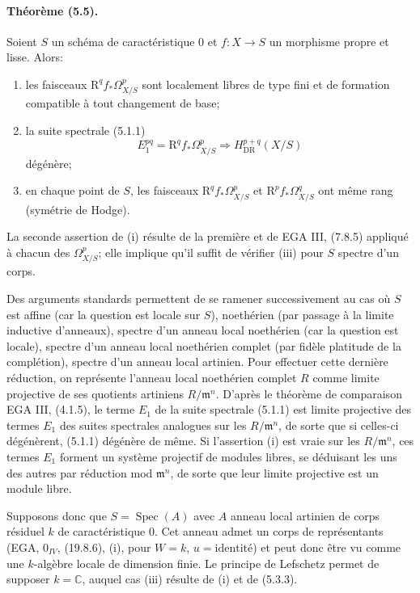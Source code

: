 \documentclass[10pt]{article}
\newcommand{\R}{\mathrm R}
\providecommand{\C}{\mathbb C}
\providecommand{\Spec}{\operatorname{Spec}}
\providecommand{\DR}{\operatorname{DR}}
\begin{document}
\paragraph{Théorème (5.5).} Soient $S$ un schéma de caractéristique $0$ et $f:X\to S$ un morphisme propre et lisse. Alors:
\begin{enumerate}[label=(\roman*)]
\item les faisceaux $\R^qf_*\Omega_{X/S}^p$ sont localement libres de type fini et de formation compatible à tout changement de base;
\item la suite spectrale (5.1.1)
\[
E_1^{pq}=\R^qf_*\Omega_{X/S}^p\Longrightarrow H_{\DR}^{p+q}(X/S)
\]
dégénère;
\item en chaque point de $S$, les faisceaux $\R^qf_*\Omega_{X/S}^p$ et $\R^pf_*\Omega_{X/S}^q$ ont même rang (symétrie de Hodge).
\end{enumerate}
La seconde assertion de (i) résulte de la première et de EGA III, (7.8.5) appliqué à chacun des $\Omega_{X/S}^p$; elle implique qu'il suffit de vérifier (iii) pour $S$ spectre d'un corps.

Des arguments standards permettent de se ramener successivement au cas où $S$ est affine (car la question est locale sur $S$), noethérien (par passage à la limite inductive d'anneaux), spectre d'un anneau local noethérien (car la question est locale), spectre d'un anneau local noethérien complet (par fidèle platitude de la complétion), spectre d'un anneau local artinien. Pour effectuer cette dernière réduction, on représente l'anneau local noethérien complet $R$ comme limite projective de ses quotients artiniens $R/\mathfrak m^n$. D'après le théorème de comparaison EGA III, (4.1.5), le terme $E_1$ de la suite spectrale (5.1.1) est limite projective des termes $E_1$ des suites spectrales analogues sur les $R/\mathfrak m^n$, de sorte que si celles-ci dégénèrent, (5.1.1) dégénère de même. Si l'assertion (i) est vraie sur les $R/\mathfrak m^n$, ces termes $E_1$ forment un système projectif de modules libres, se déduisant les uns des autres par réduction mod $\mathfrak m^n$, de sorte que leur limite projective est un module libre.

Supposons donc que $S=\Spec(A)$ avec $A$ anneau local artinien de corps résiduel $k$ de caractéristique $0$. Cet anneau admet un corps de représentants (EGA, $0_{IV}$, (19.8.6), (i), pour $W=k$, $u=\mathrm{identité}$) et peut donc être vu comme une $k$-algèbre locale de dimension finie. Le principe de Lefschetz permet de supposer $k=\C$, auquel cas (iii) résulte de (i) et de (5.3.3).
\end{document}

